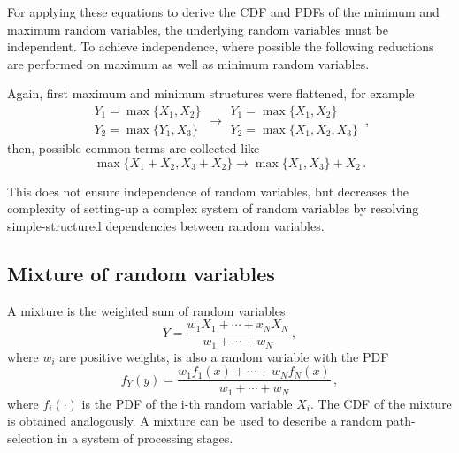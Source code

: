 \documentclass[a4paper, 10pt]{paper}
\begin{document}
For applying these equations to derive the CDF and PDFs of the minimum and maximum random variables, the 
underlying random variables must be independent. To achieve independence, where possible the following 
reductions are performed on maximum as well as minimum random variables.

Again, first maximum and minimum structures were flattened, for example
\begin{equation}
 \begin{array}{l}
  Y_1 = \max\{X_1,X_2\}\\
  Y_2 = \max\{Y_1,X_3\}
 \end{array} \longrightarrow
 \begin{array}{l}
  Y_1 = \max\{X_1,X_2\}\\
  Y_2 = \max\{X_1,X_2,X_3\}
 \end{array}\,, \nonumber
\end{equation}
then, possible common terms are collected like
\begin{equation}
 \max\{X_1 + X_2, X_3 + X_2\} \longrightarrow \max\{X_1,X_3\}+X_2\,. \nonumber
\end{equation}

This does not ensure independence of random variables, but decreases the complexity of
setting-up a complex system of random variables by resolving simple-structured 
dependencies between random variables.

\subsection{Mixture of random variables}
A mixture is the weighted sum of random variables
\begin{equation}
 Y = \frac{w_1X_1+\cdots+x_NX_N}{w_1+\cdots+w_N}\,, \nonumber
\end{equation}
where $w_i$ are positive weights, is also a random variable with the PDF
\begin{equation}
 f_Y(y) = \frac{w_1f_1(x)+\cdots+w_Nf_N(x)}{w_1+\cdots+w_N}\,,\nonumber
\end{equation}
where $f_i(\cdot)$ is the PDF of the i-th random variable $X_i$. The CDF of the
mixture is obtained analogously. A mixture can be used to describe a random 
path-selection in a system of processing stages. 
\end{document}
